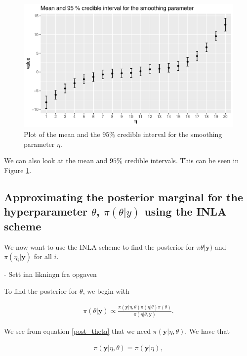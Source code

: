 \begin{figure}[h]
    \centering
    \includegraphics[width=\textwidth]{Images/post_eta_mcmc.pdf}
    \caption{Plot of the mean and the $95\%$ credible interval for the smoothing parameter $\eta$. }
    \label{fig:post_eta_mcmc}
\end{figure}

We can also look at the mean and $95 \%$ credible intervals. This can be seen in Figure \ref{fig:post_eta_mcmc}.


\subsection{Approximating the posterior marginal for the hyperparameter $\theta$, $\pi(\theta|y)$ using the INLA scheme}
\label{theta_post_inla}

We now want to use the INLA scheme to find the posterior for $\pi\theta| \boldsymbol{y})$ and $\pi(\eta_i| \boldsymbol{y})$ for all $i$.

- Sett inn likningn fra opgaven

To find the posterior for $\theta$, we begin with

\begin{align}\label{post_theta}
    \pi(\theta|\mathbf{y}) \propto \frac{\pi(\mathbf{y}|\eta,\theta)\pi(\eta|\theta)\pi(\theta)}{\pi(\eta|\theta, \mathbf{y})}.
\end{align}

We see from equation \ref{post_theta} that we need $\pi(\boldsymbol{y}| \eta, \theta)$. We have that 

\begin{align}
    \pi(\mathbf{y}| \eta, \theta) = \pi(\mathbf{y}|\eta),  
\end{align}


